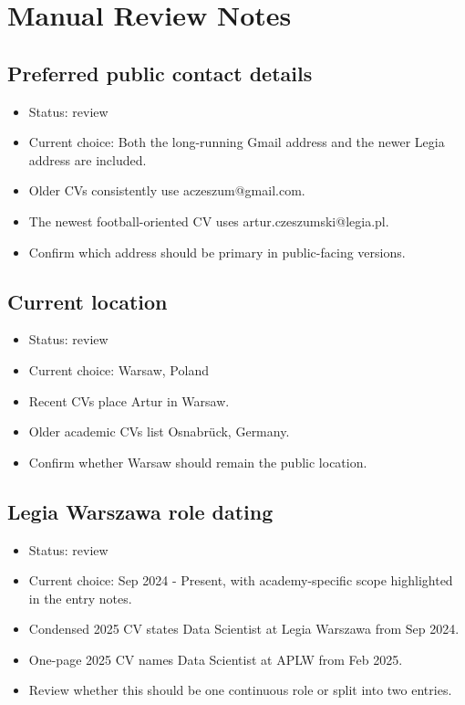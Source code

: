 \documentclass[
  oneside]{article}
\author{}
\date{}
\providecommand{\tightlist}{%
  \setlength{\itemsep}{0pt}\setlength{\parskip}{0pt}}
\begin{document}
\section{Manual Review Notes}\label{manual-review-notes}

\subsection{Preferred public contact
details}\label{preferred-public-contact-details}

\begin{itemize}
\tightlist
\item
  Status: review
\item
  Current choice: Both the long-running Gmail address and the newer
  Legia address are included.
\item
  Older CVs consistently use aczeszum@gmail.com.
\item
  The newest football-oriented CV uses artur.czeszumski@legia.pl.
\item
  Confirm which address should be primary in public-facing versions.
\end{itemize}

\subsection{Current location}\label{current-location}

\begin{itemize}
\tightlist
\item
  Status: review
\item
  Current choice: Warsaw, Poland
\item
  Recent CVs place Artur in Warsaw.
\item
  Older academic CVs list Osnabrück, Germany.
\item
  Confirm whether Warsaw should remain the public location.
\end{itemize}

\subsection{Legia Warszawa role
dating}\label{legia-warszawa-role-dating}

\begin{itemize}
\tightlist
\item
  Status: review
\item
  Current choice: Sep 2024 - Present, with academy-specific scope
  highlighted in the entry notes.
\item
  Condensed 2025 CV states Data Scientist at Legia Warszawa from Sep
  2024.
\item
  One-page 2025 CV names Data Scientist at APLW from Feb 2025.
\item
  Review whether this should be one continuous role or split into two
  entries.
\end{itemize}
\end{document}
